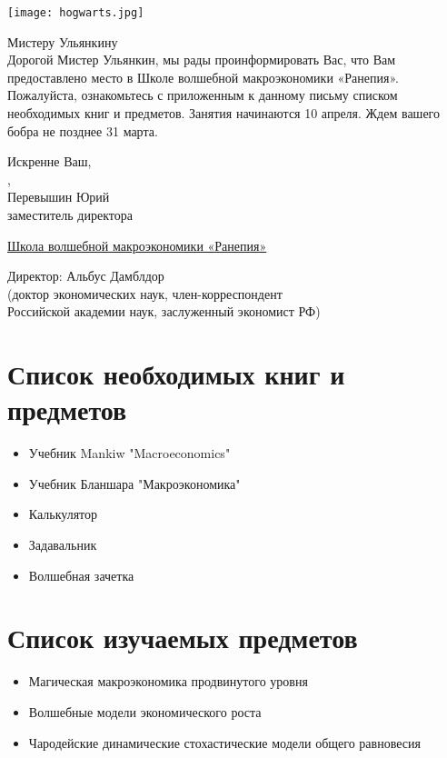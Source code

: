\documentclass[14pt,a4paper, oneside]{article}
\begin{document}
\pagestyle{empty}
\begin{center}
\texttt{[image: hogwarts.jpg]}
\end{center}
\vspace{1cm}
{\fontsize{12}{1}\selectfont Мистеру Ульянкину}
\vspace{2.5cm}\\
Дорогой Мистер Ульянкин,
мы рады проинформировать Вас, что Вам предоставлено место в Школе волшебной макроэкономики «Ранепия».
Пожалуйста, ознакомьтесь с приложенным к данному письму списком необходимых книг и предметов.
Занятия начинаются 10 апреля. Ждем вашего бобра не позднее 31 марта.

\vfill
Искренне Ваш,\\
,\\
Перевышин Юрий \\
заместитель директора

\href{http://economy.ranepa.ru/makroekonomika-2/}{Школа волшебной макроэкономики «Ранепия»}

\begin{center}
Директор: Альбус Дамблдор\\
(доктор экономических наук, член-корреспондент\\ Российской академии наук, заслуженный экономист РФ)
\end{center}

\newpage
\pagestyle{fancy}
\section {Список необходимых книг и предметов}
\newcommand{\magic} {\texttt{[image: wand.png]}}
\newcommand{\myitem}{\item[\magic]}
\begin{itemize}
\myitem Учебник Mankiw "Macroeconomics"
\myitem Учебник Бланшара "Макроэкономика"
\myitem Калькулятор
\myitem Задавальник
\myitem Волшебная зачетка
\end{itemize}

\newpage
\section{Список изучаемых предметов}
\begin{itemize}
\myitem Магическая макроэкономика продвинутого уровня
\myitem Волшебные модели экономического роста
\myitem Чародейские динамические стохастические модели общего равновесия
\end{itemize}
\end{document}
